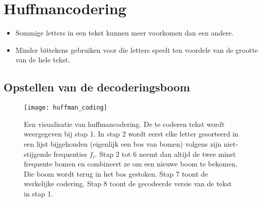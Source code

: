 \section{Huffmancodering}
\begin{itemize}
    \item Sommige letters in een tekst kunnen meer voorkomen dan een andere.
    \item Minder bittekens gebruiken voor die letters speelt ten voordele van de grootte van de hele tekst.
\end{itemize}

\subsection{Opstellen van de decoderingsboom}
\begin{figure}[ht]
    \centering
    \texttt{[image: huffman\_coding]}
    \caption{Een visualisatie van huffmancodering. De te coderen tekst wordt weergegeven bij stap 1. 
    In stap 2 wordt eerst elke letter gesorteerd in een lijst bijgehouden (eigenlijk een bos van bomen) volgens zijn niet-stijgende frequenties $f_i$. Stap 2 tot 6 neemt dan altijd de twee minst frequente bomen en combineert ze om een nieuwe boom te bekomen. Die boom wordt terug in het bos gestoken. Stap 7 toont de werkelijke codering. Stap 8 toont de gecodeerde versie van de tekst in stap 1.}
    \label{fig:huffman_coding}
\end{figure}
